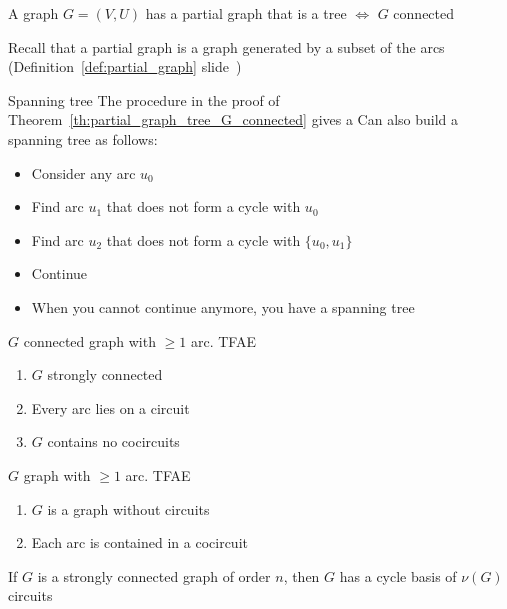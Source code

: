 \documentclass[aspectratio=169]{beamer}\usepackage[]{graphicx}\usepackage[]{xcolor}
\begin{document}
\begin{frame}
\begin{theorem}\label{th:partial_graph_tree_G_connected}
A graph $G=(V,U)$ has a partial graph that is a tree $\iff$ $G$ connected
\end{theorem}
\vfill
Recall that a partial graph is a graph generated by a subset of the arcs (Definition~\ref{def:partial_graph} slide~\pageref{def:partial_graph})
\end{frame}

\begin{frame}{Spanning tree}
The procedure in the proof of Theorem~\ref{th:partial_graph_tree_G_connected} gives a 
\vfill
Can also build a spanning tree as follows:
\begin{itemize}
\item Consider any arc $u_0$
\item Find arc $u_1$ that does not form a cycle with $u_0$
\item Find arc $u_2$ that does not form a cycle with $\{u_0,u_1\}$
\item Continue
\item When you cannot continue anymore, you have a spanning tree
\end{itemize}
\end{frame}




\begin{frame}
\begin{theorem}
$G$ connected graph with $\geq 1$ arc. TFAE
\begin{enumerate}
\item $G$ strongly connected
\item Every arc lies on a circuit
\item $G$ contains no cocircuits
\end{enumerate}
\end{theorem}
\end{frame}


\begin{frame}
\begin{theorem}
$G$ graph with $\geq 1$ arc. TFAE
\begin{enumerate}
\item $G$ is a graph without circuits
\item Each arc is contained in a cocircuit
\end{enumerate}
\end{theorem}
\vfill
\begin{theorem}
If $G$ is a strongly connected graph of order $n$, then $G$ has a cycle basis of $\nu(G)$ circuits
\end{theorem}
\end{frame}
\end{document}
